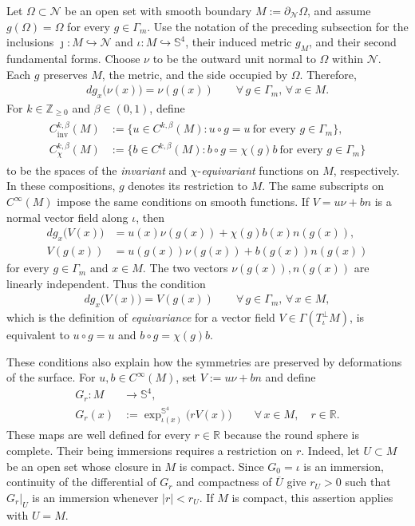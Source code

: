 \documentclass[a4paper,11pt,oneside,reqno]{amsart}
\numberwithin{equation}{section}
\theoremstyle{definition}
\begin{document}
Let $\Omega\subset\mathcal N$ be an open set with smooth
boundary $M:=\partial_{\mathcal N}\Omega$, and assume
$g(\Omega)=\Omega$ for every $g\in\Gamma_m$. Use the
notation of the preceding subsection for the inclusions
$\jmath:M\hookrightarrow\mathcal N$ and
$\iota:M\hookrightarrow\mathbb S^4$, their induced metric
$g_M$, and their second fundamental forms. Choose $\nu$
to be the outward unit normal to $\Omega$ within
$\mathcal N$. Each $g$ preserves $M$, the metric, and
the side occupied by $\Omega$. Therefore,
%
\begin{align*}
    d g_x\bigl(\nu(x)\bigr)=\nu(g(x))
    \qquad\forall\,g\in\Gamma_m,\,\forall\,x\in M.
\end{align*}
%
For $k\in\mathbb Z_{\geq0}$ and $\beta\in(0,1)$, define
%
\begin{align}
    \label{eq:s4-symmetry-spaces}
    \begin{split}
        C^{k,\beta}_{\mathrm{inv}}(M)
        &:=
        \{u\in C^{k,\beta}(M):
        u\circ g=u\ \text{for every }g\in\Gamma_m\},\\
        C^{k,\beta}_{\chi}(M)
        &:=
        \{b\in C^{k,\beta}(M):
        b\circ g=\chi(g)b\ \text{for every }g\in\Gamma_m\}
    \end{split}
\end{align}
%
to be the spaces of the \textit{invariant} and $\chi$-\textit{equivariant} functions on $M$, respectively. In these compositions, $g$ denotes its restriction to $M$.
The same subscripts on $C^\infty(M)$ impose the same
conditions on smooth functions.
If $V=u\nu+bn$ is a normal vector field along $\iota$, then
%
\begin{align*}
    d g_x\bigl(V(x)\bigr)
    &=u(x)\nu(g(x))+\chi(g)b(x)n(g(x)),\\
    V(g(x))
    &=u(g(x))\nu(g(x))+b(g(x))n(g(x))
\end{align*}
%
for every $g\in\Gamma_m$ and $x\in M$. The two vectors
$\nu(g(x)),n(g(x))$ are linearly independent. Thus the
condition
%
\begin{align*}
    d g_x\bigl(V(x)\bigr)=V(g(x))
    \qquad\forall\,g\in\Gamma_m,\,\forall\,x\in M,
\end{align*}
%
which is the definition of \textit{equivariance} for a vector field $V\in\Gamma(T^\perp_\iota M)$, is
equivalent to $u\circ g=u$ and $b\circ g=\chi(g)b$.

These conditions also explain how the symmetries are
preserved by deformations of the surface.
For $u,b\in C^\infty(M)$, set $V:=u\nu+bn$ and define
%
\begin{align*}
    G_r:M&\longrightarrow\mathbb{S}^4,\\
    G_r(x)&:=\exp_{\iota(x)}^{\mathbb{S}^4}
    \bigl(rV(x)\bigr)
    \qquad\forall\,x\in M,\quad r\in\mathbb{R}.
\end{align*}
%
These maps are well defined for every $r\in\mathbb{R}$
because the round sphere is complete.
Their being immersions requires a restriction on $r$.
Indeed, let $U\subset M$ be an open set whose closure
in $M$ is compact. Since $G_0=\iota$ is an immersion,
continuity of the differential of $G_r$ and compactness
of $\overline U$ give $r_U>0$ such that $G_r|_U$
is an immersion whenever $|r|<r_U$.
If $M$ is compact, this assertion applies with $U=M$.
\end{document}
